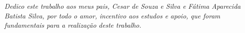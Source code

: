 \begin{dedicatoria}
   \vspace*{\fill}
   \centering
   \noindent
   \textit{     Dedico este trabalho aos meus pais, Cesar de Souza e Silva e Fátima Aparecida Batista Silva, por todo o amor, incentivo aos estudos e apoio, que foram fundamentais para a realização deste trabalho.} \vspace*{\fill}
\end{dedicatoria}

